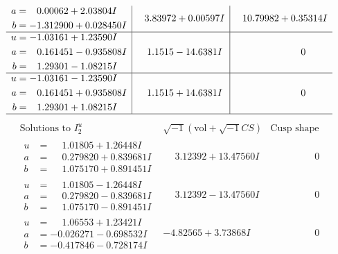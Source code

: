 \documentclass[1p]{elsarticle_modified}
\theoremstyle{definition}
\newcommand{\I}{\sqrt{-1}}
\begin{document}
$$\begin{array}{c|c|c}
\begin{aligned}
a &= \phantom{-}0.00062 + 2.03804 I \\
b &= -1.312900 + 0.028450 I\end{aligned}
 & \phantom{-}3.83972 + 0.00597 I & \phantom{-}10.79982 + 0.35314 I \\ \hline\begin{aligned}
u &= -1.03161 + 1.23590 I \\
a &= \phantom{-}0.161451 - 0.935808 I \\
b &= \phantom{-}1.29301 - 1.08215 I\end{aligned}
 & \phantom{-}1.1515 - 14.6381 I & \phantom{-0.000000 } 0 \\ \hline\begin{aligned}
u &= -1.03161 - 1.23590 I \\
a &= \phantom{-}0.161451 + 0.935808 I \\
b &= \phantom{-}1.29301 + 1.08215 I\end{aligned}
 & \phantom{-}1.1515 + 14.6381 I & \phantom{-0.000000 } 0\\
 \hline 
 \end{array}$$\newpage$$\begin{array}{c|c|c}  
\text{Solutions to }I^u_{2}& \I (\text{vol} + \sqrt{-1}CS) & \text{Cusp shape}\\
 \hline 
\begin{aligned}
u &= \phantom{-}1.01805 + 1.26448 I \\
a &= \phantom{-}0.279820 + 0.839681 I \\
b &= \phantom{-}1.075170 + 0.891451 I\end{aligned}
 & \phantom{-}3.12392 + 13.47560 I & \phantom{-0.000000 } 0 \\ \hline\begin{aligned}
u &= \phantom{-}1.01805 - 1.26448 I \\
a &= \phantom{-}0.279820 - 0.839681 I \\
b &= \phantom{-}1.075170 - 0.891451 I\end{aligned}
 & \phantom{-}3.12392 - 13.47560 I & \phantom{-0.000000 } 0 \\ \hline\begin{aligned}
u &= \phantom{-}1.06553 + 1.23421 I \\
a &= -0.026271 - 0.698532 I \\
b &= -0.417846 - 0.728174 I\end{aligned}
 & -4.82565 + 3.73868 I & \phantom{-0.000000 } 0 \\ \hline\begin{aligned}

\end{aligned}
\end{array}$$
\end{document}
